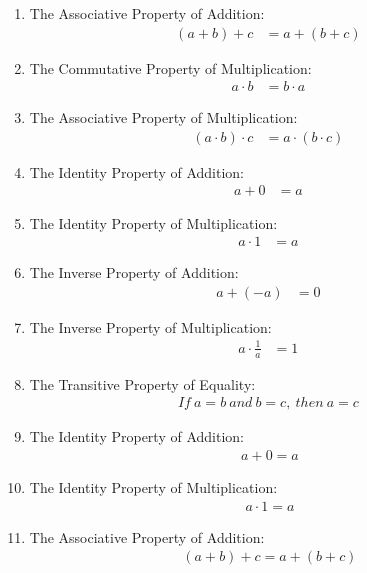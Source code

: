\documentclass{article}
\begin{document}
\begin{enumerate}
\item The Associative Property of Addition:
\begin{align*}
(a + b) + c &= a + (b + c) \
\end{align*}

\item The Commutative Property of Multiplication:
\begin{align*}
a \cdot b &= b \cdot a \
\end{align*}

\item The Associative Property of Multiplication:
\begin{align*}
(a \cdot b) \cdot c &= a \cdot (b \cdot c) \
\end{align*}

\item The Identity Property of Addition:
\begin{align*}
a + 0 &= a \
\end{align*}

\item The Identity Property of Multiplication:
\begin{align*}
a \cdot 1 &= a \
\end{align*}

\item The Inverse Property of Addition:
\begin{align*}
a + (-a) &= 0 \
\end{align*}

\item The Inverse Property of Multiplication:
\begin{align*}
a \cdot \frac{1}{a} &= 1 \
\end{align*}

\item The Transitive Property of Equality:
\begin{align*}
If\ a = b\ and\ b = c,\ then\ a = c \
\end{align*}

\item The Identity Property of Addition:
\begin{align*}
a + 0 = a
\end{align*}

\item The Identity Property of Multiplication:
\begin{align*}
a \cdot 1 = a
\end{align*}

\item The Associative Property of Addition:
\begin{align*}
(a + b) + c = a + (b + c)
\end{align*}


\end{enumerate}
\end{document}
